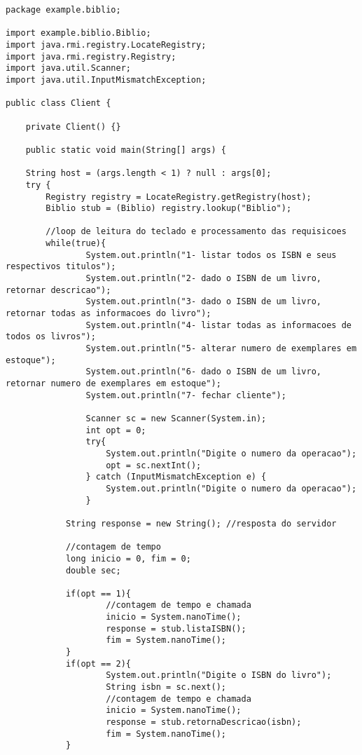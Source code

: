 \documentclass[11pt, brazil]{article} %
\begin{document}
\begin{verbatim}
package example.biblio;

import example.biblio.Biblio;
import java.rmi.registry.LocateRegistry;
import java.rmi.registry.Registry;
import java.util.Scanner;
import java.util.InputMismatchException;

public class Client {

    private Client() {}

    public static void main(String[] args) {

	String host = (args.length < 1) ? null : args[0];
	try {
	    Registry registry = LocateRegistry.getRegistry(host);
	    Biblio stub = (Biblio) registry.lookup("Biblio");
            
	    //loop de leitura do teclado e processamento das requisicoes
	    while(true){
                System.out.println("1- listar todos os ISBN e seus respectivos titulos");
                System.out.println("2- dado o ISBN de um livro, retornar descricao");
                System.out.println("3- dado o ISBN de um livro, retornar todas as informacoes do livro");
                System.out.println("4- listar todas as informacoes de todos os livros");
                System.out.println("5- alterar numero de exemplares em estoque");
                System.out.println("6- dado o ISBN de um livro, retornar numero de exemplares em estoque");
                System.out.println("7- fechar cliente");

                Scanner sc = new Scanner(System.in);
                int opt = 0;
                try{
                    System.out.println("Digite o numero da operacao");
                    opt = sc.nextInt();
                } catch (InputMismatchException e) {
                    System.out.println("Digite o numero da operacao");
                }
	    	
	    	String response = new String(); //resposta do servidor
	    
	    	//contagem de tempo
	    	long inicio = 0, fim = 0;
	    	double sec;
	    	
	    	if(opt == 1){
                    //contagem de tempo e chamada
                    inicio = System.nanoTime();
                    response = stub.listaISBN();
                    fim = System.nanoTime();
	    	}
	    	if(opt == 2){
                    System.out.println("Digite o ISBN do livro");
                    String isbn = sc.next();
                    //contagem de tempo e chamada
                    inicio = System.nanoTime();
                    response = stub.retornaDescricao(isbn);
                    fim = System.nanoTime();
	    	}
                

\end{verbatim}
\end{document}

